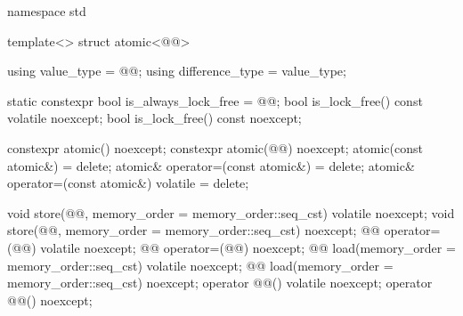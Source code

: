 \begin{codeblock}
namespace std {
  template<> struct atomic<@@> {
    using value_type = @@;
    using difference_type = value_type;

    static constexpr bool is_always_lock_free = @@;
    bool is_lock_free() const volatile noexcept;
    bool is_lock_free() const noexcept;

    constexpr atomic() noexcept;
    constexpr atomic(@@) noexcept;
    atomic(const atomic&) = delete;
    atomic& operator=(const atomic&) = delete;
    atomic& operator=(const atomic&) volatile = delete;

    void store(@@, memory_order = memory_order::seq_cst) volatile noexcept;
    void store(@@, memory_order = memory_order::seq_cst) noexcept;
    @@ operator=(@@) volatile noexcept;
    @@ operator=(@@) noexcept;
    @@ load(memory_order = memory_order::seq_cst) volatile noexcept;
    @@ load(memory_order = memory_order::seq_cst) noexcept;
    operator @@() volatile noexcept;
    operator @@() noexcept;

}}
\end{codeblock}

